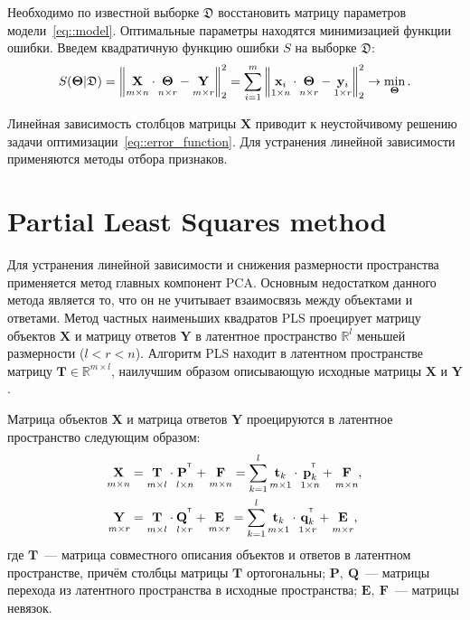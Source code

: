 \documentclass[12pt,twoside]{article}
\newcommand{\bx}{\mathbf{x}}
\newcommand{\by}{\mathbf{y}}
\newcommand{\bY}{\mathbf{Y}}
\newcommand{\bX}{\mathbf{X}}
\newcommand{\bt}{\mathbf{t}}
\newcommand{\bp}{\mathbf{p}}
\newcommand{\bq}{\mathbf{q}}
\newcommand{\bP}{\mathbf{P}}
\newcommand{\bT}{\mathbf{T}}
\newcommand{\bQ}{\mathbf{Q}}
\newcommand{\bE}{\mathbf{E}}
\newcommand{\bF}{\mathbf{F}}
\newcommand{\bTheta}{\boldsymbol{\Theta}}
\newcommand{\T}{^{\text{\tiny\sffamily\upshape\mdseries T}}}
\begin{document}
Необходимо по известной выборке $\mathfrak{D}$ восстановить матрицу параметров модели~\eqref{eq::model}.
Оптимальные параметры находятся минимизацией функции ошибки.
Введем квадратичную функцию ошибки $S$ на выборке $\mathfrak{D}$:
\begin{equation}
	S(\bTheta | \mathfrak{D}) = {\left\| \underset{m \times n}{\vphantom{\by}\mathbf{X}} \cdot \underset{n \times r}{\vphantom{\by}\bTheta} - \underset{m \times r}{\vphantom{\by}\mathbf{Y}} \right\| }_2^2 = \sum_{i=1}^m \left\| \underset{1 \times n}{\vphantom{\by}\bx_i} \cdot \underset{n \times r}{\vphantom{\by}\bTheta} - \underset{1 \times r}{\vphantom{\by}\by_i} \right\|_2^2 \rightarrow\min_{\bTheta}.
\label{eq::error_function}
\end{equation}
 
Линейная зависимость столбцов матрицы $\bX$ приводит к неустойчивому решению задачи оптимизации~\eqref{eq::error_function}. Для устранения линейной зависимости применяются методы отбора признаков.

\section{Partial Least Squares method}

Для устранения линейной зависимости и снижения размерности пространства применяется метод главных компонент PCA. 
Основным недостатком данного метода является то, что он не учитывает взаимосвязь между объектами и ответами.
Метод частных наименьших квадратов PLS проецирует матрицу объектов $\bX$ и матрицу ответов $\bY$ в латентное пространство $\mathbb{R}^l$ меньшей размерности ($l < r < n$).
Алгоритм PLS находит в латентном пространстве матрицу $\bT \in \mathbb{R}^{m \times l}$, наилучшим образом описывающую исходные матрицы $\bX$ и $\bY$.

Матрица объектов $\bX$ и матрица ответов $\bY$ проецируются в латентное пространство следующим образом: 
\begin{align}
\label{eq::PLS_X}
 \underset{m \times n}{\vphantom{\bQ}\bX} 
 &= \underset{m \times l}{\vphantom{\bQ}\bT} \cdot \underset{l \times n}{\vphantom{\bQ}\bP^{\T}} + \underset{m \times n}{\vphantom{\bQ}\bF} 
 = \sum_{k=1}^l \underset{m \times 1}{\vphantom{\bp_k^{\T}}\bt_k} \cdot \underset{1 \times n}{\bp_k^{\T}} + \underset{m \times n}{\vphantom{\bp_k^{\T}}\bF},\\
 \label{eq::PLS_Y}
 \underset{m \times r}{\vphantom{\bQ}\bY} 
 &= \underset{m \times l}{\vphantom{\bQ}\bT} \cdot \underset{l \times r}{\bQ^{\T}} + \underset{m \times r}{\vphantom{\bQ}\bE}
 =  \sum_{k=1}^l  \underset{m \times 1}{\vphantom{\bq_k^{\T}}\bt_k} \cdot \underset{1 \times r}{\bq_k^{\T}} +  \underset{m \times r}{\vphantom{\bq_k^{\T}}\bE},
\end{align}
где $\bT$~--- матрица совместного описания объектов и ответов в латентном пространстве, причём столбцы матрицы $\bT$ ортогональны; $\bP,\ \bQ$~--- матрицы перехода из латентного пространства в  исходные пространства; $\bE,\ \bF$~--- матрицы невязок. 
\end{document}
